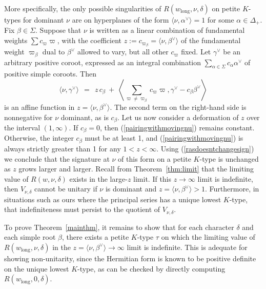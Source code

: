 \documentclass[12pt]{article}
\newcommand{\thmref}[1]{Theorem~\ref{#1}}
\numberwithin{equation}{section}
\renewcommand\a{\alpha}
\renewcommand\b{\beta}
\renewcommand\d{\delta}
\renewcommand\({\left(}
\renewcommand\){\right)}
\begin{document}
More specifically, the only possible singularities of $R(w_{\text{long}},\nu,\delta)$  on petite $K$-types for   dominant $\nu$ are on hyperplanes of the form $\langle \nu,\alpha^\vee\rangle =1$ for some $\alpha \in \Delta_+$.  Fix $\beta\in\Sigma$.  Suppose that $\nu$ is written as a linear combination of fundamental weights $\sum c_\varpi \varpi$, with the coefficient $z:=c_{\varpi_\beta}=\langle \nu,\beta^\vee\rangle$ of the fundamental weight $\varpi_\beta$ dual to $\beta^\vee$ allowed to vary, but all other $c_\varpi$ fixed.  Let $\gamma^\vee$ be an arbitrary positive coroot, expressed as an integral combination $\sum_{\alpha\in\Sigma}c_\a \a^\vee$ of  positive simple coroots.  Then
\begin{equation}\label{pairingwithmovingnu}
  \langle \nu,\gamma^\vee \rangle  \ \ = \ \ z\, c_\beta \ + \ \left\langle \sum_{\varpi\neq\varpi_\b}c_\varpi \varpi ,\gamma^\vee- c_\b \b^\vee \right\rangle
\end{equation}
is an affine function in $z=\langle \nu,\beta^\vee\rangle$.  The second term on the right-hand side is nonnegative for $\nu$ dominant, as is $c_\beta$.  Let us now consider a deformation of $z$ over the interval $(1,\infty)$.  If $c_\beta=0$, then (\ref{pairingwithmovingnu}) remains constant.  Otherwise, the integer $c_\beta$ must be at least 1, and (\ref{pairingwithmovingnu}) is always strictly greater than 1 for any $1<z<\infty$.  Using (\ref{rasdoesntchangesign}) we conclude that the signature at $\nu$ of this form on a petite $K$-type is unchanged as $z$ grows larger and larger.  Recall from \thmref{thm:limit} that the limiting value of $R(w,\nu,\delta)$ exists in the large-$z$ limit.  If this $z\rightarrow \infty$ limit is indefinite, then $V_{\nu,\delta}$ cannot be unitary if $\nu$ is dominant and $z=\langle \nu,\beta^\vee\rangle>1$.  Furthermore, in situations such as ours where  the principal series has a unique lowest $K$-type, that indefiniteness must persist to the quotient of $V_{\nu,\delta}$.




To prove Theorem~\ref{mainthm}, it remains to show that for each character $\d$ and each simple root $\beta$, there exists a petite $K$-type $\tau$ on which the limiting value of $R(w_\text{long},\nu,\delta)$ in the $z=\langle \nu,\beta^\vee\rangle\rightarrow \infty$ limit is indefinite.  This is adequate for showing non-unitarity, since the Hermitian form  is known to be positive definite on the unique lowest $K$-type, as can be checked by directly computing  $R(w_\text{long},0,\delta)$.
\end{document}
